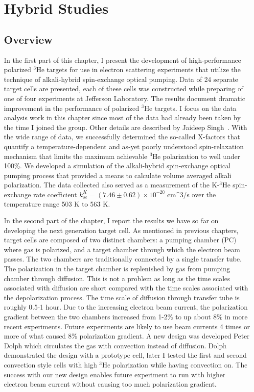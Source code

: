 \chapter{Hybrid Studies}
\label{chap4}

\section{Overview}

In the first part of this chapter, I present the development of high-performance polarized $^{3}$He targets for use in electron scattering experiments that utilize the technique of alkali-hybrid spin-exchange optical pumping. Data of 24 separate target cells are presented, each of these cells was constructed while preparing of one of four experiments at Jefferson Laboratory. The results document dramatic improvement in the performance of polarized $^{3}$He targets. I focus on the data analysis work in this chapter since most of the data had already been taken by the time I joined the group. Other details are described by Jaideep Singh~\cite{PhysRevC.91.055205}. With the wide range of data, we successfully determined the so-called X-factors that quantify a temperature-dependent and as-yet poorly understood spin-relaxation mechanism that limits the maximum achievable $^{3}$He polarization to well under 100\%. We developed a simulation of the alkali-hybrid spin-exchange optical pumping process that provided a means to calculate volume averaged alkali polarization. The data collected also served as a measurement of the K-$^{3}$He spin-exchange rate coefficient $k_{se}^{K}=(7.46\pm0.62)\times10^{-20}$ cm^{3}/s over the temperature range 503 K to 563 K.

In the second part of the chapter, I report the results we have so far on developing the next generation target cell. As mentioned in previous chapters, target cells are composed of two distinct chambers: a pumping chamber (PC) where gas is polarized, and a target chamber through which the electron beam passes. The two chambers are traditionally connected by a single transfer tube. The polarization in the target chamber is replenished by gas from pumping chamber through diffusion. This is not a problem as long as the time scales associated with diffusion are short compared with the time scales associated with the depolarization process. The time scale of diffusion through transfer tube is roughly 0.5-1 hour. Due to the increasing electron beam current, the polarization gradient between the two chambers increased from 1-2\% to up about 8\% in more recent experiments. Future experiments are likely to use beam currents 4 times or more of what caused 8\% polarization gradient. A new design was developed Peter Dolph which circulates the gas with convection instead of diffusion. Dolph demonstrated the design with a prototype cell, later I tested the first and second convection style cells with high $^{3}$He polarization while having convection on. The success with our new design enables future experiment to run with higher electron beam current without causing too much polarization gradient.

\section{}